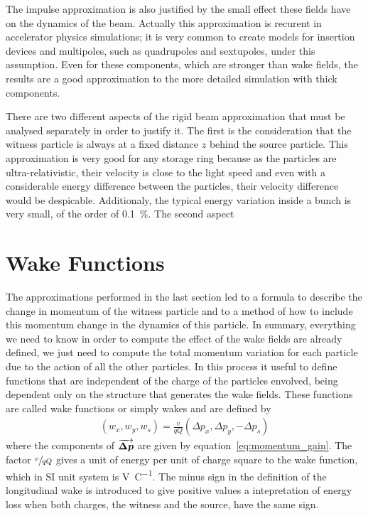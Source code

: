     The impulse approximation is also justified by the small effect these fields have on the dynamics of the beam. Actually this approximation is recurent in accelerator physics simulations; it is very common to create models for insertion devices and multipoles, such as quadrupoles and sextupoles, under this assumption. Even for these components, which are stronger than wake fields, the results are a good approximation to the more detailed simulation with thick components.

    There are two different aspects of the rigid beam approximation that must be analysed separately in order to justify it. The first is the consideration that the witness particle is always at a fixed distance $z$ behind the source particle. This approximation is very good for any storage ring because as the particles are ultra-relativistic, their velocity is close to the light speed and even with a considerable energy difference between the particles, their velocity difference would be despicable. Additionaly, the typical energy variation inside a bunch is very small, of the order of \SI{0.1}{\percent}. {\huge The second aspect}

\section{Wake Functions}\label{sec:wake_functions}

    The approximations performed in the last section led to a formula to describe the change in momentum of the witness particle and to a method of how to include this momentum change in the dynamics of this particle. In summary, everything we need to know in order to compute the effect of the wake fields are already defined, we just need to compute the total momentum variation for each particle due to the action of all the other particles. In this process it useful to define functions that are independent of the charge of the particles envolved, being dependent only on the structure that generates the wake fields. These functions are called wake functions or simply wakes and are defined by
    \begin{align}\label{eq:wake_definition}
	  	\left(w_x, w_y, w_s\right) =
	  	\frac{v}{qQ} \left(\Delta p_x, \Delta p_y, -\Delta p_s\right)
    \end{align}
    where the components of $\overrightarrow{\boldsymbol{\Delta p}}$ are given by equation~\eqref{eq:momentum_gain}. The factor $\sfrac{v}{qQ}$ gives a unit of energy per unit of charge square to the wake function, which in SI unit system is \si{\volt\per\coulomb}.  The minus sign in the definition of the longitudinal wake is introduced to give positive values a intepretation of energy loss when both charges, the witness and the source, have the same sign.

